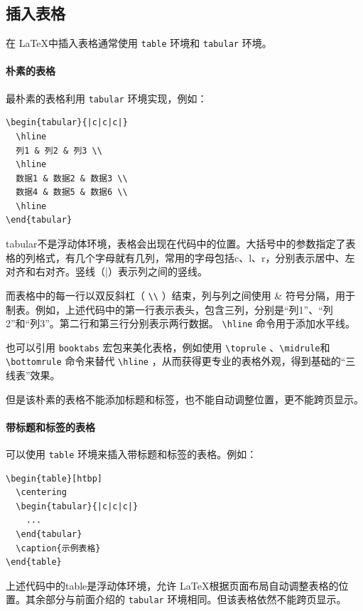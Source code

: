 \subsection{插入表格}
在 \LaTeX 中插入表格通常使用 \texttt{table} 环境和 \texttt{tabular} 环境。

\paragraph{朴素的表格} 最朴素的表格利用 \texttt{tabular} 环境实现，例如：
\begin{verbatim}
\begin{tabular}{|c|c|c|}
  \hline
  列1 & 列2 & 列3 \\
  \hline
  数据1 & 数据2 & 数据3 \\
  数据4 & 数据5 & 数据6 \\
  \hline
\end{tabular}
\end{verbatim}

tabular不是浮动体环境，表格会出现在代码中的位置。大括号中的参数指定了表格的列格式，有几个字母就有几列，常用的字母包括c、l、r，分别表示居中、左对齐和右对齐。竖线（|）表示列之间的竖线。

而表格中的每一行以双反斜杠（ \verb|\\| ）结束，列与列之间使用 \& 符号分隔，用于制表。例如，上述代码中的第一行表示表头，包含三列，分别是“列1”、“列2”和“列3”。第二行和第三行分别表示两行数据。 \verb|\hline| 命令用于添加水平线。

也可以引用 \verb|booktabs| 宏包来美化表格，例如使用 \verb|\toprule| 、\verb|\midrule|和 \verb|\bottomrule| 命令来替代 \verb|\hline| ，从而获得更专业的表格外观，得到基础的“三线表”效果。

但是该朴素的表格不能添加标题和标签，也不能自动调整位置，更不能跨页显示。

\paragraph{带标题和标签的表格} 可以使用 \texttt{table} 环境来插入带标题和标签的表格。例如：
\begin{verbatim}
\begin{table}[htbp]
  \centering
  \begin{tabular}{|c|c|c|}
    ...
  \end{tabular}
  \caption{示例表格}
\end{table}
\end{verbatim}
上述代码中的table是浮动体环境，允许 \LaTeX 根据页面布局自动调整表格的位置。其余部分与前面介绍的 \texttt{tabular} 环境相同。但该表格依然不能跨页显示。

